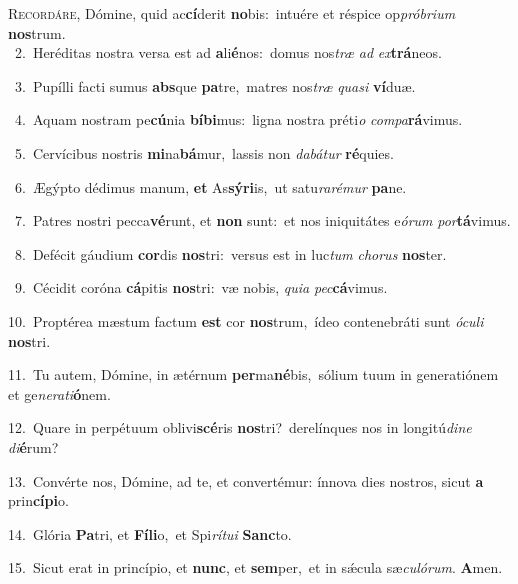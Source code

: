 \lettrine{\initial\textcolor{\initialcolor}{R}}{ecordáre,} Dómine, quid ac\-\textbf{cí}\-derit \textbf{no}\-bis:~\star intuére et réspice op\-\textit{pró}\-\textit{bri}\textit{um} \textbf{nos}\-trum.\\
{\numbfont\textcolor{\numbcolor}{~2.}}~Heréditas nostra versa est ad \textbf{a}\-li\-\textbf{é}\-nos:~\star domus nos\textit{træ} \textit{ad} \textit{ex}\-\textbf{trá}neos.\par
{\numbfont\textcolor{\numbcolor}{~3.}}~Pupílli facti sumus \textbf{abs}\-que \textbf{pa}\-tre,~\star matres nos\textit{træ} \textit{qua}\-\textit{si} \textbf{ví}\-duæ.\par
{\numbfont\textcolor{\numbcolor}{~4.}}~Aquam nostram pe\-\textbf{cú}\-nia \textbf{bí}\-\textbf{bi}mus:~\star ligna nostra préti\textit{o} \textit{com}\-\textit{pa}\textbf{rá}vimus.\par
{\numbfont\textcolor{\numbcolor}{~5.}}~Cervícibus nostris \textbf{mi}\-na\-\textbf{bá}\-mur,~\star lassis non \textit{da}\-\textit{bá}\textit{tur} \textbf{ré}\-quies.\par
{\numbfont\textcolor{\numbcolor}{~6.}}~Ægýpto dédimus manum, \textbf{et} As\-\textbf{sý}\-\textbf{ri}is,~\star ut satu\-\textit{ra}\-\textit{ré}\textit{mur} \textbf{pa}\-ne.\par
{\numbfont\textcolor{\numbcolor}{~7.}}~Patres nostri pecca\-\textbf{vé}\-runt, et \textbf{non} sunt:~\star et nos iniquitátes e\-\textit{ó}\-\textit{rum} \textit{por}\-\textbf{tá}vimus.\par
{\numbfont\textcolor{\numbcolor}{~8.}}~Defécit gáudium \textbf{cor}\-dis \textbf{nos}\-tri:~\star versus est in luc\textit{tum} \textit{cho}\-\textit{rus} \textbf{nos}\-ter.\par
{\numbfont\textcolor{\numbcolor}{~9.}}~Cécidit coróna \textbf{cá}\-pitis \textbf{nos}\-tri:~\star væ nobis, \textit{qui}\-\textit{a} \textit{pec}\-\textbf{cá}vimus.\par
{\numbfont\textcolor{\numbcolor}{10.}}~Proptérea mæstum factum \textbf{est} cor \textbf{nos}\-trum,~\star ídeo contenebráti sunt \textit{ó}\-\textit{cu}\textit{li} \textbf{nos}\-tri.\par
{\numbfont\textcolor{\numbcolor}{11.}}~Tu autem, Dómine, in ætérnum \textbf{per}\-ma\-\textbf{né}\-bis,~\star sólium tuum in generatiónem et ge\-\textit{ne}\-\textit{ra}\textit{ti}\textbf{ó}nem.\par
{\numbfont\textcolor{\numbcolor}{12.}}~Quare in perpétuum oblivi\-\textbf{scé}\-ris \textbf{nos}\-tri?~\star derelínques nos in longitú\-\textit{di}\-\textit{ne} \textit{di}\-\textbf{é}rum?\par
{\numbfont\textcolor{\numbcolor}{13.}}~Convérte nos, Dómine, ad te, et convertémur: ínnova dies nostros, sicut \textbf{a} prin\-\textbf{cí}\-\textbf{pi}o.\par
{\numbfont\textcolor{\numbcolor}{14.}}~Glória \textbf{Pa}\-tri, et \textbf{Fí}\-\textbf{li}o,~\star et Spi\-\textit{rí}\-\textit{tu}\textit{i} \textbf{Sanc}\-to.\par
{\numbfont\textcolor{\numbcolor}{15.}}~Sicut erat in princípio, et \textbf{nunc}\-, et \textbf{sem}\-per,~\star et in sǽcula sæ\-\textit{cu}\-\textit{ló}\textit{rum}. \textbf{A}\-men.\par
